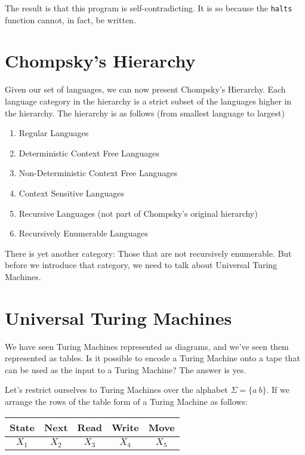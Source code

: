 \documentclass[letterpaper,12pt,openany,reqno]{book}%
\newcommand{\code}[1] {\lstinline[breaklines=yes,breakatwhitespace=yes]{#1}}
\begin{document}
The result is that this program is self-contradicting. It is so because the \code{halts} function cannot, in fact, be written.

\section{Chompsky's Hierarchy}
Given our set of languages, we can now present Chompsky's Hierarchy. Each language category in the hierarchy is a strict subset of the languages higher in the hierarchy. The hierarchy is as follows (from smallest language to largest)
\begin{enumerate}
\item Regular Languages
\item Deterministic Context Free Languages
\item Non-Deterministic Context Free Languages
\item Context Sensitive Languages
\item Recursive Languages (not part of Chompsky's original hierarchy)
\item Recursively Enumerable Languages
\end{enumerate}
There is yet another category: Those that are not recursively enumerable. But before we introduce that category, we need to talk about Universal Turing Machines.

\section{Universal Turing Machines}
\label{S.universal.TM}
We have seen Turing Machines represented as diagrams, and we've seen them represented as tables. Is it possible to encode a Turing Machine onto a tape that can be used as the input to a Turing Machine? The answer is yes.

Let's restrict ourselves to Turing Machines over the alphabet $\Sigma = \{a\ b\}$. If we arrange the rows of the table form of a Turing Machine as follows:

\begin{tabular}{|c|c|c|c|c|}
\hline
State & Next & Read & Write & Move \\
\hline
$X_1$ & $X_2$ & $X_3$ & $X_4$ & $X_5$ \\
\hline
\end{tabular}
\end{document}
